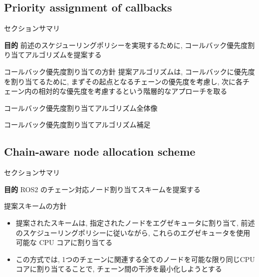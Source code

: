 \subsection{Priority assignment of callbacks}
\label{ssec: priority assignment of callbacks}

\begin{frame}{セクションサマリ}
    \begin{itembox}[l]{\textbf{目的}}
        前述のスケジューリングポリシーを実現するために, コールバック優先度割り当てアルゴリズムを提案する
    \end{itembox}
\end{frame}

\begin{frame}{コールバック優先度割り当ての方針}
    提案アルゴリズムは, コールバックに優先度を割り当てるために, まずその起点となるチェーンの優先度を考慮し, 次に各チェーン内の相対的な優先度を考慮するという階層的なアプローチを取る
\end{frame}

\begin{frame}{コールバック優先度割り当てアルゴリズム全体像}
\end{frame}

\begin{frame}{コールバック優先度割り当てアルゴリズム補足}
\end{frame}


\subsection{Chain-aware node allocation scheme}
\label{ssec: chain-aware node allocation scheme}

\begin{frame}{セクションサマリ}
    \begin{itembox}[l]{\textbf{目的}}
        ROS2 のチェーン対応ノード割り当てスキームを提案する
    \end{itembox}
\end{frame}

\begin{frame}{提案スキームの方針}
    \begin{itemize}
        \item 提案されたスキームは, 指定されたノードをエグゼキュータに割り当て, 前述のスケジューリングポリシーに従いながら, これらのエグゼキュータを使用可能な CPU コアに割り当てる
        \item この方式では, 1つのチェーンに関連する全てのノードを可能な限り同じCPUコアに割り当てることで, チェーン間の干渉を最小化しようとする
    \end{itemize}
\end{frame}


